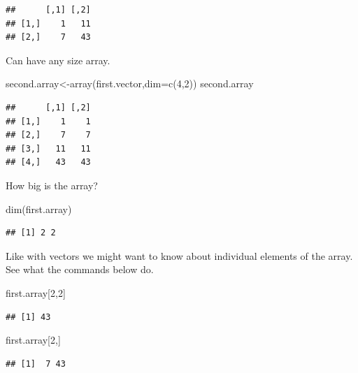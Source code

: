 \documentclass[
]{gitbook}
\newenvironment{Shaded}{\begin{snugshade}}{\end{snugshade}}
\newcommand{\AttributeTok}[1]{\textcolor[rgb]{0.77,0.63,0.00}{#1}}
\newcommand{\DecValTok}[1]{\textcolor[rgb]{0.00,0.00,0.81}{#1}}
\newcommand{\FunctionTok}[1]{\textcolor[rgb]{0.00,0.00,0.00}{#1}}
\newcommand{\NormalTok}[1]{#1}
\newcommand{\OtherTok}[1]{\textcolor[rgb]{0.56,0.35,0.01}{#1}}
\begin{document}
\begin{verbatim}
##      [,1] [,2]
## [1,]    1   11
## [2,]    7   43
\end{verbatim}

Can have any size array.

\begin{Shaded}
\begin{Highlighting}[]
\NormalTok{second.array}\OtherTok{\textless{}{-}}\FunctionTok{array}\NormalTok{(first.vector,}\AttributeTok{dim=}\FunctionTok{c}\NormalTok{(}\DecValTok{4}\NormalTok{,}\DecValTok{2}\NormalTok{))}
\NormalTok{second.array}
\end{Highlighting}
\end{Shaded}

\begin{verbatim}
##      [,1] [,2]
## [1,]    1    1
## [2,]    7    7
## [3,]   11   11
## [4,]   43   43
\end{verbatim}

How big is the array?

\begin{Shaded}
\begin{Highlighting}[]
\FunctionTok{dim}\NormalTok{(first.array)}
\end{Highlighting}
\end{Shaded}

\begin{verbatim}
## [1] 2 2
\end{verbatim}

Like with vectors we might want to know about individual elements of the array. See what the commands below do.

\begin{Shaded}
\begin{Highlighting}[]
\NormalTok{first.array[}\DecValTok{2}\NormalTok{,}\DecValTok{2}\NormalTok{]}
\end{Highlighting}
\end{Shaded}

\begin{verbatim}
## [1] 43
\end{verbatim}

\begin{Shaded}
\begin{Highlighting}[]
\NormalTok{first.array[}\DecValTok{2}\NormalTok{,]}
\end{Highlighting}
\end{Shaded}

\begin{verbatim}
## [1]  7 43
\end{verbatim}
\end{document}
